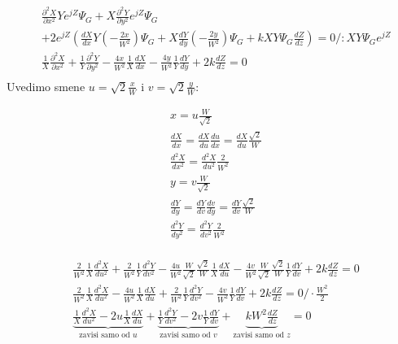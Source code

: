 \documentclass[fleqn]{report}
\begin{document}
\begin{align*}
     & \frac{\partial^2 X}{\partial x^2} Y e^{jZ} \Psi_G + X \frac{\partial^2 Y}{\partial y^2} e^{jZ} \Psi_G                                                                                                  \\
     & + 2e^{jZ} \left(\frac{dX}{dx} Y \left(-\frac{2x}{W^2}\right)\Psi_G + X \frac{dY}{dy} \left(-\frac{2y}{W^2}\right)\Psi_G + kXY\Psi_G\frac{dZ}{dz}\right)  = 0 \bigg/ : XY\Psi_G e^{jZ}                  \\
     & \frac{1}{X} \frac{\partial^2 X}{\partial x^2} + \frac{1}{Y} \frac{\partial^2 Y}{\partial y^2} - \frac{4x}{W^2}\frac{1}{X} \frac{dX}{dx} - \frac{4y}{W^2}\frac{1}{Y}\frac{dY}{dy} + 2k\frac{dZ}{dz} = 0 \\
\end{align*}
Uvedimo smene $u = \sqrt2 \frac{x}{W}$ i $v = \sqrt2 \frac{y}{W}$:
\begin{tbox}
    \begin{align*}
         & x = u \frac{W}{\sqrt2}                                                      \\
         & \frac{dX}{dx} = \frac{dX}{du}\frac{du}{dx} = \frac{dX}{du} \frac{\sqrt2}{W} \\
         & \frac{d^2X}{dx^2} = \frac{d^2X}{du^2} \frac{2}{W^2}                         \\
         & y = v \frac{W}{\sqrt2}                                                      \\
         & \frac{dY}{dy} = \frac{dY}{dv}\frac{dv}{dy} = \frac{dY}{dv} \frac{\sqrt2}{W} \\
         & \frac{d^2Y}{dy^2} = \frac{d^2Y}{dv^2} \frac{2}{W^2}                         \\
    \end{align*}
\end{tbox}
\begin{align*}
     & \frac{2}{W^2}\frac{1}{X}\frac{d^2X}{du^2} + \frac{2}{W^2} \frac{1}{Y}\frac{d^2Y}{dv^2} - \frac{4u}{W^2}\frac{W}{\sqrt2}\frac{\sqrt2}{W}\frac{1}{X}\frac{dX}{du} - \frac{4v}{W^2}\frac{W}{\sqrt2}\frac{\sqrt2}{W}\frac{1}{Y}\frac{dY}{dv} + 2k \frac{dZ}{dz} = 0     \\
     & \frac{2}{W^2}\frac{1}{X}\frac{d^2X}{du^2} - \frac{4u}{W^2}\frac{1}{X}\frac{dX}{du} + \frac{2}{W^2} \frac{1}{Y}\frac{d^2Y}{dv^2} - \frac{4v}{W^2}\frac{1}{Y}\frac{dY}{dv} + 2k \frac{dZ}{dz} = 0 \bigg/ \cdot \frac{W^2}{2}                                          \\
     & \underbrace{\frac{1}{X}\frac{d^2X}{du^2} - 2u\frac{1}{X}\frac{dX}{du}}_\text{zavisi samo od $u$} + \underbrace{\frac{1}{Y}\frac{d^2Y}{dv^2} - 2v\frac{1}{Y}\frac{dY}{dv}}_\text{zavisi samo od $v$} + \underbrace{kW^2 \frac{dZ}{dz}}_\text{zavisi samo od $z$} = 0 \\
\end{align*}
\end{document}
